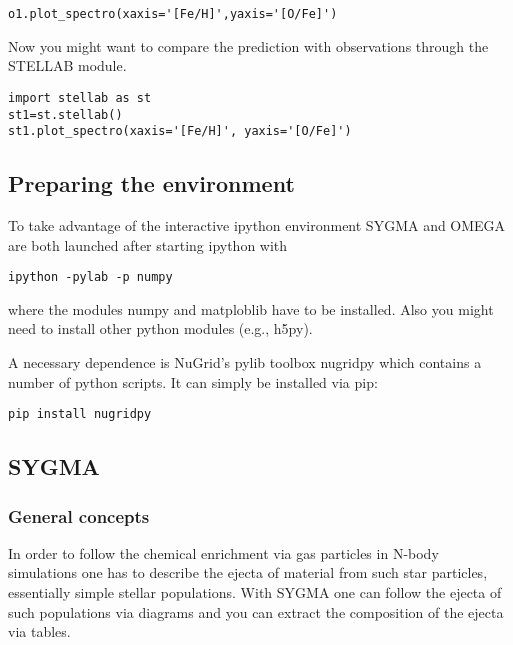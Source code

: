 \begin{verbatim}
o1.plot_spectro(xaxis='[Fe/H]',yaxis='[O/Fe]')
\end{verbatim}

Now you might want to compare the prediction with
observations through the STELLAB module.

\begin{verbatim}
import stellab as st
st1=st.stellab()
st1.plot_spectro(xaxis='[Fe/H]', yaxis='[O/Fe]')
\end{verbatim}





\subsection{Preparing the environment}%

To take advantage of the interactive ipython environment 
SYGMA and OMEGA are both launched after starting
ipython with


\begin{verbatim}
ipython -pylab -p numpy
\end{verbatim}

where the modules numpy and matploblib have to be installed.
Also you might need to install other python modules (e.g., h5py).

A necessary dependence is NuGrid's pylib toolbox nugridpy which
contains a number of python scripts.  It can simply be installed via
pip:

\begin{verbatim}
pip install nugridpy
\end{verbatim}



\subsection{SYGMA}

\subsubsection{General concepts}

In order to follow the chemical enrichment via gas particles
in N-body simulations one has to describe the ejecta of material
from such star particles, essentially simple stellar populations. 
With SYGMA one can follow the ejecta of such populations via
diagrams and you can extract the composition of the ejecta via tables.


